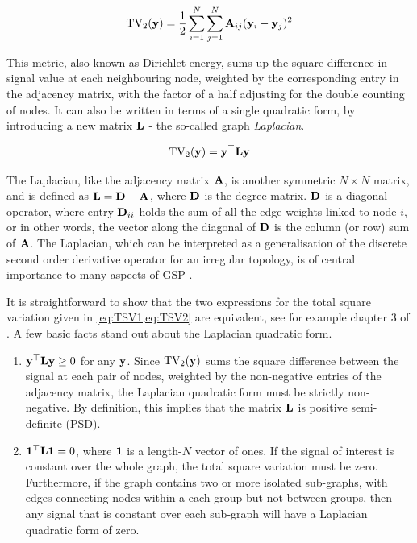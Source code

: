 \begin{equation}
    \label{eq:TSV1}
    \text{TV}_2(\mathbf{y}) = \frac{1}{2}\sum_{i=1}^N \sum_{j=1}^N \mathbf{A}_{ij} (\mathbf{y}_i - \mathbf{y}_j)^2
\end{equation}

This metric, also known as Dirichlet energy, sums up the square difference in signal value at each neighbouring node, weighted by the corresponding entry in the adjacency matrix, with the factor of a half adjusting for the double counting of nodes. It can also be written in terms of a single quadratic form, by introducing a new matrix $\mathbf{L}$ - the so-called graph \textit{Laplacian}. 

\begin{equation}
    \label{eq:TSV2}
    \text{TV}_2(\mathbf{y}) = \mathbf{y}^\top \mathbf{L} \mathbf{y}
\end{equation}

The Laplacian, like the adjacency matrix $\mathbf{A}$, is another symmetric $N \times N$ matrix, and is defined as $\mathbf{L} = \mathbf{D} - \mathbf{A}$, where $\mathbf{D}$ is the degree matrix. $\mathbf{D}$ is a diagonal operator, where entry $\mathbf{D}_{ii}$ holds the sum of all the edge weights linked to node $i$, or in other words, the vector along the diagonal of $\mathbf{D}$ is the column (or row) sum of $\mathbf{A}$. The Laplacian, which can be interpreted as a generalisation of the discrete second order derivative operator for an irregular topology, is of central importance to many aspects of GSP \citep{Shuman2013}. 

\newpage

It is straightforward to show that the two expressions for the total square variation given in \cref{eq:TSV1,eq:TSV2} are equivalent, see for example chapter 3 of \cite{Ortega2022}. A few basic facts stand out about the Laplacian quadratic form.

\begin{enumerate}
    \item $\mathbf{y}^\top \mathbf{L} \mathbf{y} \geq 0$ for any $\mathbf{y}$. Since $\text{TV}_2(\mathbf{y})$ sums the square difference between the signal at each pair of nodes, weighted by the non-negative entries of the adjacency matrix, the Laplacian quadratic form must be strictly non-negative. By definition, this implies that the matrix $\mathbf{L}$ is positive semi-definite (PSD). 
    \item $\mathbf{1}^\top \mathbf{L} \mathbf{1} = 0$, where $\mathbf{1}$ is a length-$N$ vector of ones. If the signal of interest is constant over the whole graph, the total square variation must be zero. Furthermore, if the graph contains two or more isolated sub-graphs, with edges connecting nodes within a each group but not between groups, then any signal that is constant over each sub-graph will have a Laplacian quadratic form of zero. 
\end{enumerate}

